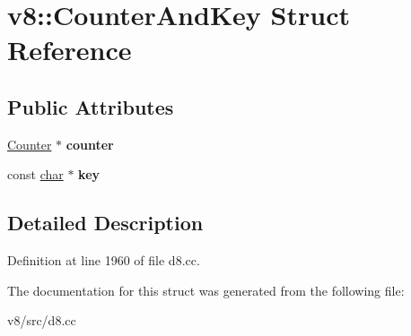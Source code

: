 \hypertarget{structv8_1_1CounterAndKey}{}\section{v8\+:\+:Counter\+And\+Key Struct Reference}
\label{structv8_1_1CounterAndKey}
\subsection*{Public Attributes}
\begin{DoxyCompactItemize}
\item 
\mbox{\label{structv8_1_1CounterAndKey_aa2d9bb18791cf1e45607f17b3dc48d36}} 
\mbox{\hyperlink{classv8_1_1Counter}{Counter}} $\ast$ {\bfseries counter}
\item 
\mbox{\label{structv8_1_1CounterAndKey_af22129bbaba86a7188a30995db746bb9}} 
const \mbox{\hyperlink{classchar}{char}} $\ast$ {\bfseries key}
\end{DoxyCompactItemize}


\subsection{Detailed Description}


Definition at line 1960 of file d8.\+cc.



The documentation for this struct was generated from the following file\+:\begin{DoxyCompactItemize}
\item 
v8/src/d8.\+cc\end{DoxyCompactItemize}
